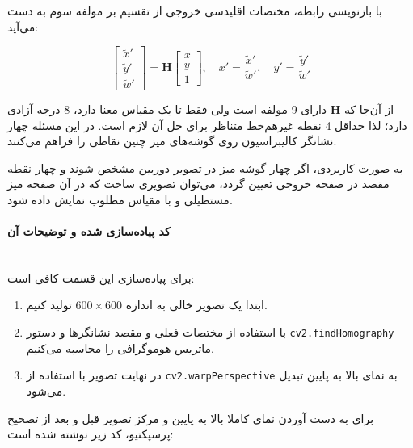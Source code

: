 \documentclass{article}
\begin{document}
 با بازنویسی رابطه، مختصات اقلیدسی خروجی از تقسیم بر مولفه سوم به دست می‌آید:

\[
\begin{bmatrix}
\tilde{x}' \\
\tilde{y}' \\
\tilde{w}'
\end{bmatrix}
=
\mathbf{H}
\begin{bmatrix}
x \\
y \\
1
\end{bmatrix},
\quad
x'=\frac{\tilde{x}'}{\tilde{w}'},
\quad
y'=\frac{\tilde{y}'}{\tilde{w}'}
\]

از آن‌جا که $\mathbf{H}$ دارای 9 مولفه است ولی فقط تا یک مقیاس معنا دارد، 8 درجه آزادی دارد؛ لذا حداقل 4 نقطه غیرهم‌خط متناظر برای حل آن لازم است. در این مسئله چهار نشانگر کالیبراسیون روی گوشه‌های میز چنین نقاطی را فراهم می‌کنند. 

به صورت کاربردی، اگر چهار گوشه میز در تصویر دوربین مشخص شوند و چهار نقطه مقصد در صفحه خروجی تعیین گردد، می‌توان تصویری ساخت که در آن صفحه میز مستطیلی و با مقیاس مطلوب نمایش داده شود.

\paragraph{کد پیاده‌سازی شده و توضیحات آن}\mbox{}\\
برای پیاده‌سازی این قسمت کافی است:
\begin{enumerate}
\item ابتدا یک تصویر خالی به اندازه $600 \times 600 $ تولید کنیم.
\item با استفاده از مختصات فعلی و مقصد نشانگرها و دستور \texttt{cv2.findHomography}  ماتریس هوموگرافی را محاسبه می‌کنیم.
\item در نهایت تصویر با استفاده از \texttt{cv2.warpPerspective} به نمای بالا به پایین تبدیل می‌شود.
\end{enumerate}

برای به دست آوردن نمای کاملا بالا به پایین و مرکز تصویر قبل و بعد از تصحیح پرسپکتیو، کد زیر نوشته شده است:
\end{document}
